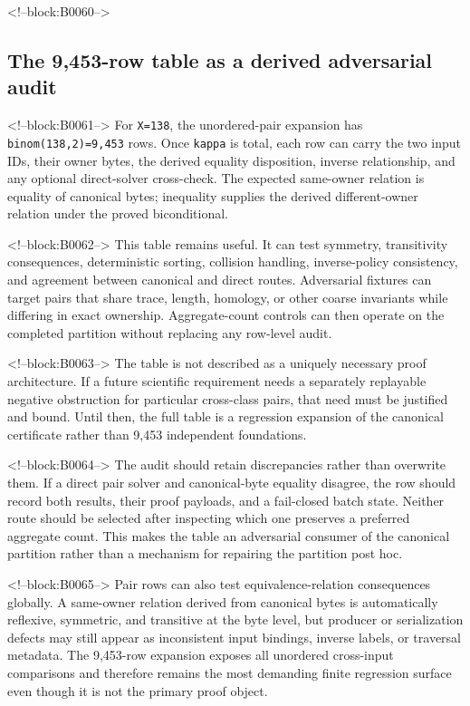 \documentclass[11pt]{article}
\begin{document}
<!--block:B0060-->
\hypertarget{43-the-9453-row-table-as-a-derived-adversarial-audit}{%
\subsection{The 9,453-row table as a derived adversarial
audit}\label{43-the-9453-row-table-as-a-derived-adversarial-audit}}

<!--block:B0061-->
For \texttt{\textbar{}X\textbar{}=138}, the unordered-pair expansion has
\texttt{binom(138,2)=9,453} rows. Once \texttt{kappa} is total, each row
can carry the two input IDs, their owner bytes, the derived equality
disposition, inverse relationship, and any optional direct-solver
cross-check. The expected same-owner relation is equality of canonical
bytes; inequality supplies the derived different-owner relation under
the proved biconditional.

<!--block:B0062-->
This table remains useful. It can test symmetry, transitivity
consequences, deterministic sorting, collision handling, inverse-policy
consistency, and agreement between canonical and direct routes.
Adversarial fixtures can target pairs that share trace, length,
homology, or other coarse invariants while differing in exact ownership.
Aggregate-count controls can then operate on the completed partition
without replacing any row-level audit.

<!--block:B0063-->
The table is not described as a uniquely necessary proof architecture.
If a future scientific requirement needs a separately replayable
negative obstruction for particular cross-class pairs, that need must be
justified and bound. Until then, the full table is a regression
expansion of the canonical certificate rather than 9,453 independent
foundations.

<!--block:B0064-->
The audit should retain discrepancies rather than overwrite them. If a
direct pair solver and canonical-byte equality disagree, the row should
record both results, their proof payloads, and a fail-closed batch state.
Neither route should be selected after inspecting which one preserves a
preferred aggregate count. This makes the table an adversarial consumer
of the canonical partition rather than a mechanism for repairing the
partition post hoc.

<!--block:B0065-->
Pair rows can also test equivalence-relation consequences globally. A
same-owner relation derived from canonical bytes is automatically
reflexive, symmetric, and transitive at the byte level, but producer or
serialization defects may still appear as inconsistent input bindings,
inverse labels, or traversal metadata. The 9,453-row expansion exposes
all unordered cross-input comparisons and therefore remains the most
demanding finite regression surface even though it is not the primary
proof object.
\end{document}

